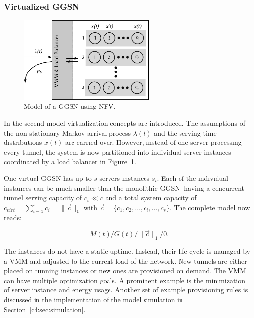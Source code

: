 \subsubsection{Virtualized \texorpdfstring{\acrshort{GGSN}}{GGSN}}
\label{c4:sec:virtual_ggsn}

\begin{figure}[htb]
	\centering
	\includegraphics[width=0.6\textwidth]{images/ggsn-virtualized.pdf}
	\caption{Model of a \acrshort{GGSN} using \acrshort{NFV}.}
\label{c4:fig:model-ggsn-virtualized}
\end{figure}

In the second model virtualization concepts are introduced. The assumptions of the non-stationary Markov arrival process $\lambda(t)$ and the serving time distributions $x(t)$ are carried over. However, instead of one server processing every tunnel, the system is now partitioned into individual server instances coordinated by a load balancer in Figure~\ref{c4:fig:model-ggsn-virtualized}. 

One virtual \gls{GGSN} has up to $s$ servers instances $s_i$. Each of the individual instances can be much smaller than the monolithic \gls{GGSN}, having a concurrent tunnel serving capacity of $c_i \ll c$ and a total system capacity of $c_{virt} = \sum_{i=1}^{s} c_i = \| \overrightarrow{c}\|_1 \text{ with } \overrightarrow{c} = \{c_1, c_2, \ldots ,c_i, \ldots ,c_s\}$. %
The complete model now reads:

\begin{equation}
	\phantom{.}M(t)/G(t)/\|\overrightarrow{c}\|_1/0\text{.}
\end{equation}

The instances do not have a static uptime. Instead, their life cycle is managed by a \gls{VMM} and adjusted to the current load of the network. New tunnels are either placed on running instances or new ones are provisioned on demand. The \gls{VMM} can have multiple optimization goals. A prominent example is the minimization of server instance and energy usage.  Another set of example provisioning rules is discussed in the implementation of the model simulation in Section~\ref{c4:sec:simulation}. 

